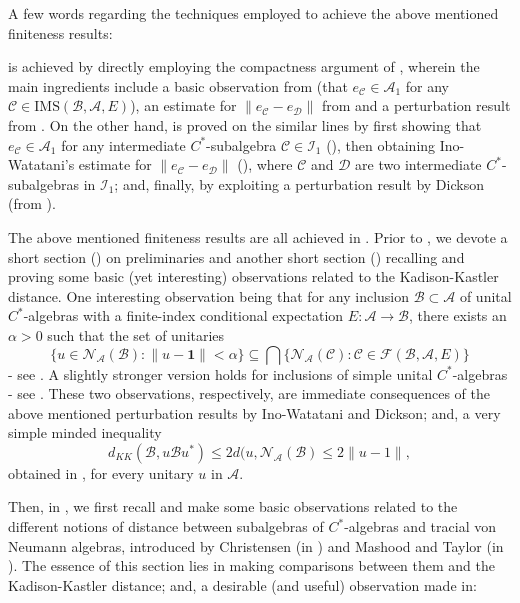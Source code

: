 \documentclass{amsart}
\numberwithin{equation}{section}
\newcommand{\IMS}{\mathrm{IMS}}
\newcommand{\mcal}{\mathcal}
\newcommand{\1}{\mathbf{1}}
\newcommand{\mA}{\mathcal{A}}
\newcommand{\mB}{\mathcal{B}}
\newcommand{\mC}{\mathcal{C}}
\newcommand{\mD}{\mathcal{D}}
\newcommand{\mN}{\mathcal{N}}
\begin{document}
A few words regarding the techniques employed to achieve the above mentioned finiteness results:

 is achieved by directly employing the
  compactness argument of \cite{IW}, wherein the main ingredients
  include a basic observation from \cite{GS} (that $e_\mC \in \mA_1$ for
  any $\mC \in \IMS(\mB, \mA, E)$), an estimate for $\|e_\mC - e_\mD\|$ from
  \cite{IW} and a perturbation result from \cite{Dickson}. On the
  other hand,  is proved on the similar lines by
  first showing that $e_\mC \in \mA_1$ for any intermediate
  $C^*$-subalgebra $\mC \in \mcal{I}_1$ (), then
  obtaining Ino-Watatani's estimate for $\|e_\mC - e_\mD\|$
  (), where $\mC$ and $\mD$ are two intermediate
  $C^*$-subalgebras in $\mcal{I}_1$; and, finally, by exploiting a
  perturbation result by Dickson (from \cite{Dickson}).

  The above mentioned finiteness results are all achieved in
  . Prior to , we
  devote a short section () on preliminaries and another
  short section () recalling and proving some
  basic (yet interesting) observations related to the Kadison-Kastler
  distance. One interesting observation being that for any inclusion
  $\mB \subset \mA$ of unital $C^*$-algebras with a finite-index
  conditional expectation $E: \mA \to\mB$, there exists an $\alpha >
  0$ such that the set of unitaries
  \[
  \{u \in \mN_{\mA}(\mB) : \| u - \1 \| < \alpha \} \subseteq \bigcap \Big\{
  \mN_{\mA}(\mC): \mC \in  \mcal{F}(\mB , \mA, E) \Big\}
  \]
  - see . A slightly  stronger version
  holds for inclusions of simple unital $C^*$-algebras - see
  . These two observations, respectively,
  are immediate consequences of the above mentioned perturbation
  results by Ino-Watatani and Dickson; and, a very simple minded
  inequality
  \[
  d_{KK}(\mB , u\mB u^*) \leq 2 d(u,
  \mN_{\mA}(\mB) \leq 2 \|u -1\|,
  \]
  obtained in , for
  every unitary $u$ in $\mA$.
    
    Then, in , we first recall and make some basic
    observations related to the different notions of distance between
    subalgebras of $C^*$-algebras and tracial von Neumann algebras,
    introduced by Christensen (in \cite{Ch1, Ch2, Ch3}) and Mashood
    and Taylor (in \cite{MT}). The essence of this section lies in
    making comparisons between them and the Kadison-Kastler distance;
    and, a desirable (and useful) observation made in:\smallskip
\end{document}
